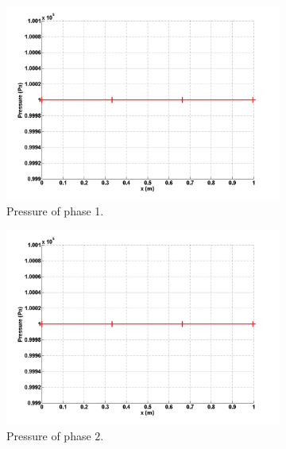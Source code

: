 %
\begin{figure}[H]
        \centering
        \begin{subfigure}[b]{0.495\textwidth}
                \centering
                \includegraphics[width=\textwidth]{figures/SEM/liquid_pressure.png}
                \caption{Pressure of phase 1.}
                \label{fig:press-1-7-eqn-sect4}
        \end{subfigure}%
        \begin{subfigure}[b]{0.495\textwidth}
                \centering
                \includegraphics[width=\textwidth]{figures/SEM/vapor_pressure.png}
                \caption{Pressure of phase $2$.}
                \label{fig:press-2-7-eqn-sect4}
        \end{subfigure}
        \caption{\label{fig:press-7-sect4}}
\end{figure}
